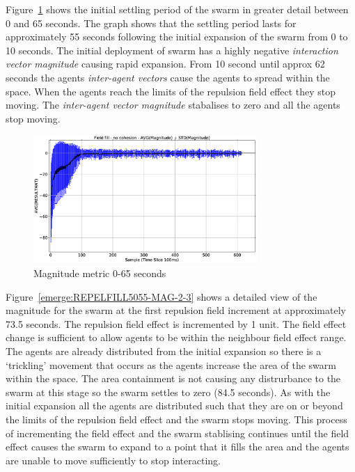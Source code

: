 \documentclass[10pt,journal,letterpaper,twoside]{IEEEtran}
\begin{document}
Figure~\ref{emerge:REPELFILL5055-MAG-1-2} shows the initial settling period of the swarm in greater detail between 0 and 65 seconds. The graph shows that the settling period lasts for approximately 55 seconds following the initial expansion of the swarm from 0 to 10 seconds. The initial deployment of swarm has a highly negative \textit{interaction vector magnitude} causing rapid expansion. From 10 second until approx 62 seconds the agents \textit{inter-agent vectors} cause the agents to spread within the space. When the agents reach the limits of the repulsion field effect they stop moving. The \textit{inter-agent vector magnitude} stabalises to zero and all the agents stop moving.

\begin{figure}
\begin{center}
\includegraphics[width=8.5cm]{figures/REPELFILL5055-MAG-1-2}
\end{center}
\caption{Magnitude metric 0-65 seconds\label{emerge:REPELFILL5055-MAG-1-2}}
\end{figure}

Figure~\ref{emerge:REPELFILL5055-MAG-2-3} shows a detailed view of the magnitude for the swarm at the first repulsion field increment at approximately 73.5 seconds. The repulsion field effect is incremented by 1 unit. The field effect change is sufficient to allow agents to be within the neighbour field effect range. The agents are already distributed from the initial expansion so there is a `trickling' movement that occurs as the agents increase the area of the swarm within the space. The area containment is not causing any distrurbance to the swarm at this stage so the swarm settles to zero (84.5 seconds). As with the initial expansion all the agents are distributed such that they are on or beyond the limits of the repulsion field effect and the swarm stops moving. This process of incrementing the field effect and the swarm stablising continues until the field effect causes the swarm to expand to a point that it fills the area and the agents are unable to move sufficiently to stop interacting.
\end{document}
